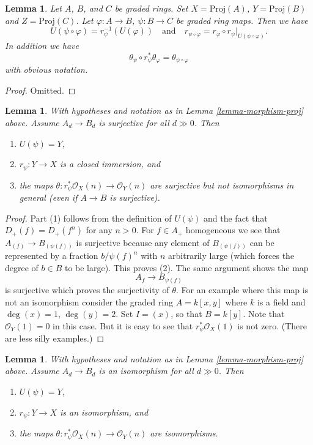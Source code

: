 \documentclass{stacks-project}
\theoremstyle{plain}
\newtheorem{lemma}[subsection]{Lemma}
\theoremstyle{definition}
\theoremstyle{remark}
\numberwithin{equation}{subsection}
\begin{document}
\begin{lemma}
\label{lemma-morphism-proj-transitive}
Let $A$, $B$, and $C$ be graded rings.
Set $X = \text{Proj}(A)$, $Y = \text{Proj}(B)$ and $Z = \text{Proj}(C)$.
Let $\varphi : A \to B$, $\psi : B \to C$ be graded ring maps.
Then we have
$$
U(\psi \circ \varphi) = r_\psi^{-1}(U(\varphi))
\quad
\text{and}
\quad
r_{\psi \circ \varphi}
=
r_\varphi \circ r_\psi|_{U(\psi \circ \varphi)}.
$$
In addition we have
$$
\theta_\psi \circ r_\psi^*\theta_\varphi
=
\theta_{\psi \circ \varphi}
$$
with obvious notation.
\end{lemma}

\begin{proof}
Omitted.
\end{proof}

\begin{lemma}
\label{lemma-surjective-graded-rings-map-proj}
With hypotheses and notation as in Lemma \ref{lemma-morphism-proj} above.
Assume $A_d \to B_d$ is surjective for all $d \gg 0$. Then
\begin{enumerate}
\item $U(\psi) = Y$,
\item $r_\psi : Y \to X$ is a closed immersion, and
\item the maps $\theta : r_\psi^*\mathcal{O}_X(n) \to \mathcal{O}_Y(n)$
are surjective but not isomorphisms in general (even if $A \to B$ is
surjective).
\end{enumerate}
\end{lemma}

\begin{proof}
Part (1) follows from the definition of $U(\psi)$ and the fact that
$D_{+}(f) = D_{+}(f^n)$ for any $n > 0$. For $f \in A_{+}$ homogeneous
we see that $A_{(f)} \to B_{(\psi(f))}$ is surjective because
any element of $B_{(\psi(f))}$ can be represented by a fraction
$b/\psi(f)^n$ with $n$ arbitrarily large (which forces the degree of
$b \in B$ to be large). This proves (2).
The same argument shows the map
$$
A_f \to B_{\psi(f)}
$$
is surjective which proves the surjectivity of $\theta$.
For an example where this map is not an isomorphism
consider the graded ring $A = k[x, y]$ where $k$ is a field
and $\deg(x) = 1$, $\deg(y) = 2$. Set $I = (x)$, so that
$B = k[y]$. Note that $\mathcal{O}_Y(1) = 0$ in this case.
But it is easy to see that $r_\psi^*\mathcal{O}_X(1)$
is not zero. (There are less silly examples.)
\end{proof}

\begin{lemma}
\label{lemma-eventual-iso-graded-rings-map-proj}
With hypotheses and notation as in Lemma \ref{lemma-morphism-proj} above.
Assume $A_d \to B_d$ is an isomorphism for all $d \gg 0$. Then
\begin{enumerate}
\item $U(\psi) = Y$,
\item $r_\psi : Y \to X$ is an isomorphism, and
\item the maps $\theta : r_\psi^*\mathcal{O}_X(n) \to \mathcal{O}_Y(n)$
are isomorphisms.
\end{enumerate}
\end{lemma}
\end{document}

